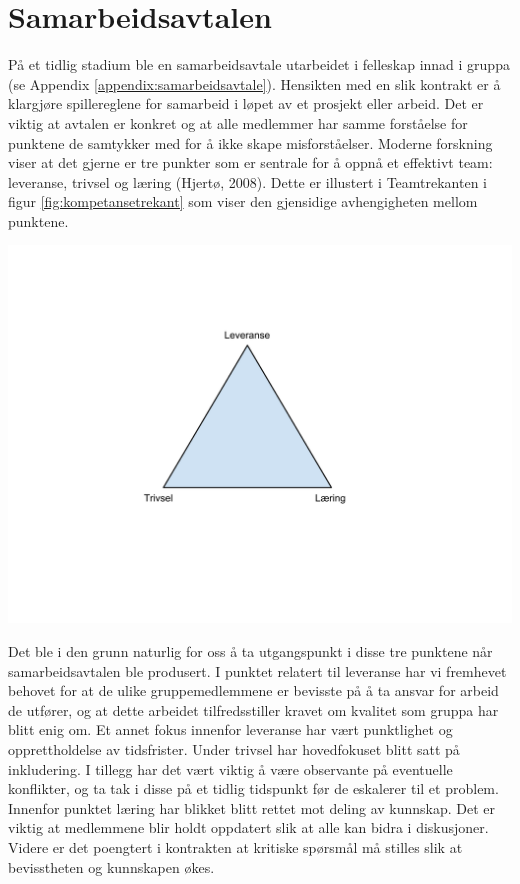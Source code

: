 \section{Samarbeidsavtalen}
På et tidlig stadium ble en samarbeidsavtale utarbeidet i felleskap innad i gruppa (se Appendix \ref{appendix:samarbeidsavtale}). Hensikten med en slik kontrakt er å klargjøre spillereglene for samarbeid i løpet av et prosjekt eller arbeid. Det er viktig at avtalen er konkret og at alle medlemmer har samme forståelse for punktene de samtykker med for å ikke skape misforståelser. Moderne forskning viser at det gjerne er tre punkter som er sentrale for å oppnå et effektivt team: leveranse, trivsel og læring (Hjertø, 2008). Dette er illustert i Teamtrekanten i figur \ref{fig:kompetansetrekant} som viser den gjensidige avhengigheten mellom punktene.\\

\begin{center}
\includegraphics[clip=true, width=1 \textwidth,
trim=0cm 5cm 0cm 3cm]{kompetansetrekant.pdf}
\label{fig:kompetansetrekant}
\end{center}

Det ble i den grunn naturlig for oss å ta utgangspunkt i disse tre punktene når samarbeidsavtalen ble produsert. I punktet relatert til leveranse har vi fremhevet behovet for at de ulike gruppemedlemmene er bevisste på å ta ansvar for arbeid de utfører, og at dette arbeidet tilfredsstiller kravet om kvalitet som gruppa har blitt enig om. Et annet fokus innenfor leveranse har vært punktlighet og opprettholdelse av tidsfrister. Under trivsel har hovedfokuset blitt satt på inkludering. I tillegg har det vært viktig å være observante på eventuelle konflikter, og ta tak i disse på et tidlig tidspunkt før de eskalerer til et problem. Innenfor punktet læring har blikket blitt rettet mot deling av kunnskap. Det er viktig at medlemmene blir holdt oppdatert slik at alle kan bidra i diskusjoner. Videre er det poengtert i kontrakten at kritiske spørsmål må stilles slik at bevisstheten og kunnskapen økes.\\

